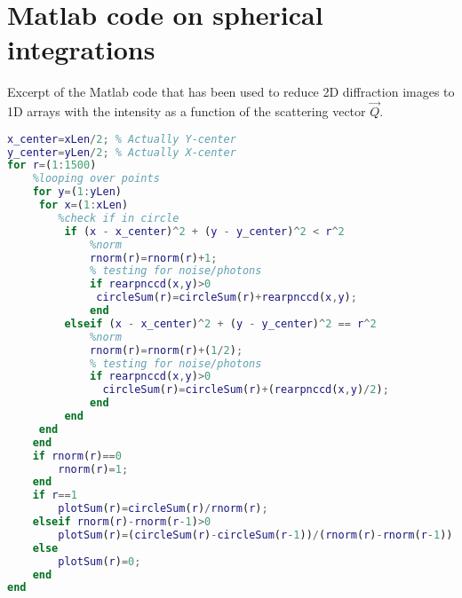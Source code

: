 %
%
%
\section{Matlab code on spherical integrations}\label{sec:spherical-integration}
Excerpt of the Matlab code that has been used to reduce 2D diffraction images to 1D arrays with the intensity as a function of the scattering vector $\vec{Q}$.
\begin{lstlisting}[language=matlab,frame=single,basicstyle=\footnotesize]
%%% CENTER OF HIT
x_center=xLen/2; % Actually Y-center
y_center=yLen/2; % Actually X-center
for r=(1:1500)
    %looping over points
    for y=(1:yLen)
     for x=(1:xLen)
        %check if in circle
         if (x - x_center)^2 + (y - y_center)^2 < r^2
             %norm
             rnorm(r)=rnorm(r)+1;
             % testing for noise/photons
             if rearpnccd(x,y)>0
              circleSum(r)=circleSum(r)+rearpnccd(x,y);
             end
         elseif (x - x_center)^2 + (y - y_center)^2 == r^2
             %norm
             rnorm(r)=rnorm(r)+(1/2);
             % testing for noise/photons
             if rearpnccd(x,y)>0
               circleSum(r)=circleSum(r)+(rearpnccd(x,y)/2);
             end
         end
     end
    end
    if rnorm(r)==0
        rnorm(r)=1;
    end
    if r==1
        plotSum(r)=circleSum(r)/rnorm(r);
    elseif rnorm(r)-rnorm(r-1)>0
        plotSum(r)=(circleSum(r)-circleSum(r-1))/(rnorm(r)-rnorm(r-1));
    else
        plotSum(r)=0;
    end
end
\end{lstlisting}
%
%
%
\iffalse

